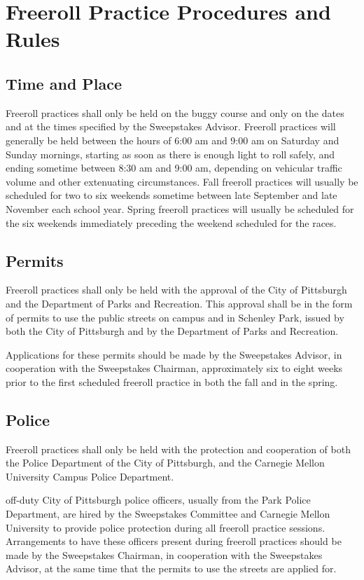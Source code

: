 \documentclass[openany]{book}
\begin{document}
\section{Freeroll Practice Procedures and Rules}

\subsection{Time and Place}

Freeroll practices shall only be held on the buggy course and only on the dates and at the times specified by the Sweepstakes Advisor. Freeroll practices will generally be held between the hours of 6:00 am and 9:00 am on Saturday and Sunday mornings, starting as soon as there is enough light to roll safely, and ending sometime between 8:30 am and 9:00 am, depending on vehicular traffic volume and other extenuating circumstances. Fall freeroll practices will usually be scheduled for two to six weekends sometime between late September and late November each school year. Spring freeroll practices will usually be scheduled for the six weekends immediately preceding the weekend scheduled for the races.

\subsection{Permits}

Freeroll practices shall only be held with the approval of the City of Pittsburgh and the Department of Parks and Recreation. This approval shall be in the form of permits to use the public streets on campus and in Schenley Park, issued by both the City of Pittsburgh and by the Department of Parks and Recreation.

Applications for these permits should be made by the Sweepstakes Advisor, in cooperation with the Sweepstakes Chairman, approximately six to eight weeks prior to the first scheduled freeroll practice in both the fall and in the spring.

\subsection{Police}

Freeroll practices shall only be held with the protection and cooperation of both the Police Department of the City of Pittsburgh, and the Carnegie Mellon University Campus Police Department.

off-duty City of Pittsburgh police officers, usually from the Park Police Department, are hired by the Sweepstakes Committee and Carnegie Mellon University to provide police protection during all freeroll practice sessions. Arrangements to have these officers present during freeroll practices should be made by the Sweepstakes Chairman, in cooperation with the Sweepstakes Advisor, at the same time that the permits to use the streets are applied for.
\end{document}
